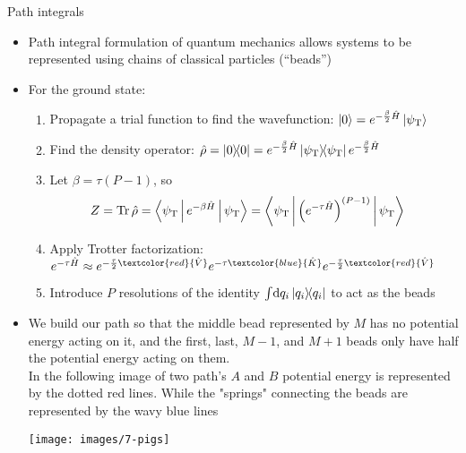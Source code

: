 \documentclass[final,t]{beamer}
\newcommand{\psiT}{\psi_{\textrm{T}}}
\DeclareMathOperator{\Tr}{Tr}
\begin{document}
\begin{frame}{}
\begin{columns}[T]
\begin{column}{.31\linewidth}
	\begin{block}{Path integrals}
		\begin{itemize}
			\item Path integral formulation of quantum mechanics allows systems to be represented using chains of classical particles (``beads'')
			\item For the ground state:
				\begin{enumerate}\setlength{\itemindent}{1em}
					\item Propagate a trial function to find the wavefunction: $\ket{0} = e^{-\frac{\beta}{2} \hat{H}} \ket{\psiT}$
					\item Find the density operator: $\hat{\rho} = \ket{0}\!\!\bra{0} = e^{-\frac{\beta}{2} \hat{H}} \ket{\psiT}\!\!\bra{\psiT} e^{-\frac{\beta}{2} \hat{H}}$
					\item Let $\beta = \tau (P-1)$, so
						\begin{align*}
							Z
							&= \Tr{\hat{\rho}}
							= \Braket{\psiT | e^{-\beta \hat{H}} | \psiT}
							= \Braket{\psiT | \left( e^{-\tau \hat{H}} \right)^{(P-1)} | \psiT}
						\end{align*}
					\item Apply Trotter factorization:~\cite{schmidt2014inclusion}
						$
							e^{-\tau \hat{H}}
							\approx
								e^{-\frac{\tau}{2} \textcolor{red}{\hat{V}}}
								e^{-\tau \textcolor{blue}{\hat{K}}}
								e^{-\frac{\tau}{2} \textcolor{red}{\hat{V}}}
						$
					\item Introduce $P$ resolutions of the identity $\int\! \dif q_i \ket{q_i}\!\!\bra{q_i}$ to act as the beads
				\end{enumerate}
			\item We build our path so that the middle bead represented by $M$ has no potential energy acting on it, and the first, last, $M-1$, and $M+1$ beads only have half the potential energy acting on them. \\
			In the following image of two path's $A$ and $B$ potential energy is represented by the dotted red lines. While the "springs" connecting the beads are represented by the wavy blue lines
				\begin{center}
					\texttt{[image: images/7-pigs]}
				\end{center}
		\end{itemize}
	\end{block}


\end{column}
\end{columns}
\end{frame}
\end{document}
